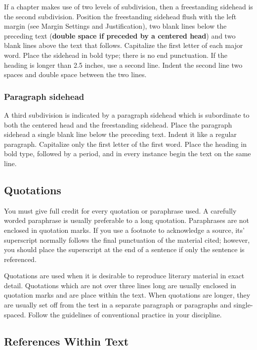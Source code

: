 If a chapter makes use of two levels of subdivision, then a
freestanding sidehead is the second subdivision. Position the
freestanding sidehead flush with the left margin (see Margin Settings
and Justification), two blank lines below the preceding text
(\textbf{double space if preceded by a centered head}) and two blank
lines above the text that follows. Capitalize the first letter of each
major word.  Place the sidehead in bold type; there is no end
punctuation. If the heading is longer than 2.5 inches, use a second
line. Indent the second line two spaces and double space between the
two lines.

\subsubsection{Paragraph sidehead}
\label{sec:ParagraphSidehead}

A third subdivision is indicated by a paragraph sidehead which is
subordinate to both the centered head and the freestanding sidehead.
Place the paragraph sidehead a single blank line below the preceding
text. Indent it like a regular paragraph. Capitalize only the first
letter of the first word. Place the heading in bold type, followed by
a period, and in every instance begin the text on the same line.

\subsection{Quotations}
\label{sec:Quotations}

You must give full credit for every quotation or paraphrase used. A
carefully worded paraphrase is usually preferable to a long quotation.
Paraphrases are not enclosed in quotation marks. If you use a footnote
to acknowledge a source, its' superscript normally follows the final
punctuation of the material cited; however, you should place the
superscript at the end of a sentence if only the sentence is
referenced.

Quotations are used when it is desirable to reproduce literary
material in exact detail. Quotations which are not over three lines
long are usually enclosed in quotation marks and are place within the
text. When quotations are longer, they are usually set off from the
test in a separate paragraph or paragraphs and single-spaced. Follow
the guidelines of conventional practice in your discipline.

\subsection{References Within Text}
\label{sec:ReferencesWithinText}

